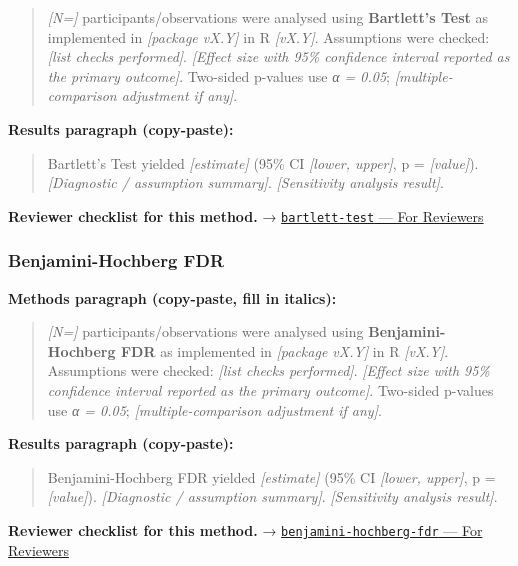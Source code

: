 \documentclass[
]{article}
\begin{document}
\begin{quote}
\emph{{[}N={]}} participants/observations were analysed using
\textbf{Bartlett's Test} as implemented in \emph{{[}package vX.Y{]}} in
R \emph{{[}vX.Y{]}}. Assumptions were checked: \emph{{[}list checks
performed{]}}. \emph{{[}Effect size with 95\% confidence interval
reported as the primary outcome{]}}. Two-sided p-values use \emph{α =
0.05}; \emph{{[}multiple-comparison adjustment if any{]}}.
\end{quote}

\textbf{Results paragraph (copy-paste):}

\begin{quote}
Bartlett's Test yielded \emph{{[}estimate{]}} (95\% CI \emph{{[}lower,
upper{]}}, p = \emph{{[}value{]}}). \emph{{[}Diagnostic / assumption
summary{]}}. \emph{{[}Sensitivity analysis result{]}}.
\end{quote}

\textbf{Reviewer checklist for this method.} →
\href{../chapters/04-inferential/bartlett-test.Rmd\#for-reviewers}{\texttt{bartlett-test}
--- For Reviewers}

\subsubsection{Benjamini-Hochberg FDR}\label{benjamini-hochberg-fdr}

\textbf{Methods paragraph (copy-paste, fill in italics):}

\begin{quote}
\emph{{[}N={]}} participants/observations were analysed using
\textbf{Benjamini-Hochberg FDR} as implemented in \emph{{[}package
vX.Y{]}} in R \emph{{[}vX.Y{]}}. Assumptions were checked: \emph{{[}list
checks performed{]}}. \emph{{[}Effect size with 95\% confidence interval
reported as the primary outcome{]}}. Two-sided p-values use \emph{α =
0.05}; \emph{{[}multiple-comparison adjustment if any{]}}.
\end{quote}

\textbf{Results paragraph (copy-paste):}

\begin{quote}
Benjamini-Hochberg FDR yielded \emph{{[}estimate{]}} (95\% CI
\emph{{[}lower, upper{]}}, p = \emph{{[}value{]}}). \emph{{[}Diagnostic
/ assumption summary{]}}. \emph{{[}Sensitivity analysis result{]}}.
\end{quote}

\textbf{Reviewer checklist for this method.} →
\href{../chapters/04-inferential/benjamini-hochberg-fdr.Rmd\#for-reviewers}{\texttt{benjamini-hochberg-fdr}
--- For Reviewers}
\end{document}
